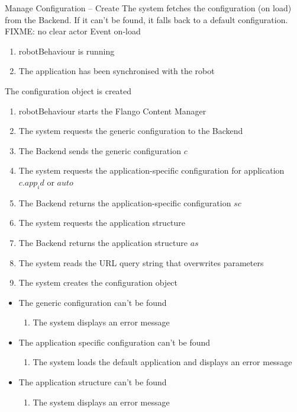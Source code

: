 \begin{suc}
{Manage Configuration -- Create}
{The system fetches the configuration (on load) from the Backend. If it can't be found, it falls back to a default configuration. FIXME: no clear actor}
{Event on-load}
{
	\begin{enumerate}
        \item robotBehaviour is running
        \item The application has been synchronised with the robot
    \end{enumerate}}
{
The configuration object is created
}
{
    \begin{enumerate}
        \item robotBehaviour starts the Flango Content Manager
        \item The system requests the generic configuration to the Backend
		\item The Backend sends the generic configuration $c$
		\item The system requests the application-specific configuration for application $c.app_id$ or $auto$
		\item The Backend returns the application-specific configuration $sc$
		\item The system requests the application structure
		\item The Backend returns the application structure $as$
		\item The system reads the URL query string that overwrites parameters
		\item The system creates the configuration object
    \end{enumerate}
}
{    
	\begin{itemize}
        \item The generic configuration can't be found
        \begin{enumerate}
        	\item The system displays an error message
    	\end{enumerate}
    	\item The application specific configuration can't be found
        \begin{enumerate}
        	\item The system loads the default application and displays an error message
    	\end{enumerate}
    	\item The application structure can't be found
        \begin{enumerate}
        	\item The system displays an error message
    	\end{enumerate}
    \end{itemize}   
}
\end{suc}

